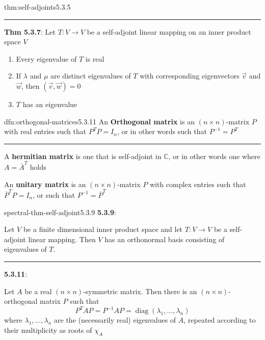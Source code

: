 \documentclass[landscape, 8pt]{extarticle}
\DeclareMathOperator{\diag}{diag}
\begin{document}
\begin{multicols}{3}
\begin{dfn}{thm:self-adjoints}{5.3.5}
    \vspace{-2pt}
    \noindent\rule{\textwidth}{0.2pt}
    \textbf{Thm 5.3.7}: Let $T : V\to V$ be a self-adjoint linear mapping on an inner product space $V$
    \vspace{-2pt}
    \begin{enumerate}
        \setlength\itemsep{0em}
        \item Every eigenvalue of $T$ is real
        \item If $\lambda$ and $\mu$ are distinct eigenvalues of $T$ with corresponding eigenvectors $\vec{v}$ and $\vec{w}$, then $(\vec{v}, \vec{w}) = 0$
        \item $T$ has an eigenvalue
    \end{enumerate}
\end{dfn}

\vspace{-5pt}
\begin{dfn}{dfn:orthogonal-matrices}{5.3.11}
    \vspace{-5pt}
    An \textbf{Orthogonal matrix} is an $(n \times n)$-matrix $P$ with real entries such that $P^{T}P = I_{n}$, or in other words such that $P^{-1} = P^{T}$

    \vspace{-2pt}
    \noindent\rule{\textwidth}{0.2pt}
    A \textbf{hermitian matrix} is one that is self-adjoint in $\mathbb{C}$, or in other words one where $A = \overline{A}^{T}$ holds


    An \textbf{unitary matrix} is an $(n \times n)$-matrix $P$ with complex entries such that $\overline{P}^{T}P = I_{n}$, or such that $P^{-1} = \overline{P}^{T}$
\end{dfn}

\vspace{-5pt}
\begin{thm}{spectral-thm-self-adjoint}{5.3.9}
    \vspace{-5pt}
    \textbf{5.3.9}: \underline{}
    
    Let $V$ be a finite dimensional inner product space and let $T : V \to V$ be a self-adjoint linear mapping. Then $V$ has an orthonormal basis consisting of eigenvalues of $T$.

    \noindent\rule{\textwidth}{0.2pt}
    \textbf{5.3.11}: \underline{}

    Let $A$ be a real $(n \times n)$-symmetric matrix. Then there is an $(n \times n)$-orthogonal matrix $P$ such that
    \[P^{T} A P = P^{-1}AP = \diag(\lambda_{1},\dots,\lambda_{n})\]
    where $\lambda_{1},\dots,\lambda_{n}$ are the (necessarily real) eigenvalues of $A$, repeated according to their multiplicity as roots of $\chi_{A}$


\end{thm}
\end{multicols}
\end{document}
